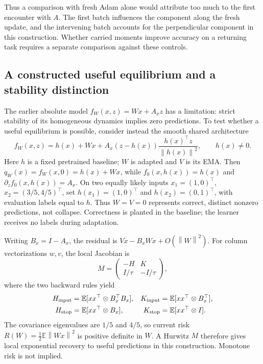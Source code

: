 \documentclass[11pt,a4paper]{article}
\newcommand{\E}{\mathbb{E}}
\newcommand{\norm}[1]{\left\lVert #1\right\rVert}
\begin{document}
Thus a comparison with fresh Adam alone would attribute too much to the
first encounter with $A$. The first batch influences the component along
the fresh update, and the intervening batch accounts for the perpendicular
component in this construction. Whether carried moments improve accuracy
on a returning task requires a separate comparison against these controls.

\subsection{A constructed useful equilibrium and a stability distinction}
The earlier absolute model $f_W(x,z)=Wx+A_xz$ has a limitation: strict
stability of its homogeneous dynamics implies zero predictions. To test
whether a useful equilibrium is possible, consider instead the smooth
shared architecture
\begin{equation}
 f_W(x,z)=h(x)+Wx+
 A_x(z-h(x))\frac{h(x)^\top z}{\norm{h(x)}^2},
 \qquad h(x)\ne0.
 \label{eq:realization}
\end{equation}
Here $h$ is a fixed pretrained baseline; $W$ is adapted and $V$ is its EMA.
Then $q_W(x)=f_W(x,0)=h(x)+Wx$, while $f_0(x,h(x))=h(x)$ and
$\partial_z f_0(x,h(x))=A_x$. On two equally likely inputs
$x_1=(1,0)^\top$, $x_2=(3/5,4/5)^\top$, set
$h(x_1)=(1,0)^\top$ and $h(x_2)=(0,1)^\top$, with evaluation labels
equal to $h$. Thus $W=V=0$ represents correct, distinct nonzero
predictions, not collapse. Correctness is planted in the baseline;
the learner receives no labels during adaptation.

Writing $B_x=I-A_x$, the residual is
$Vx-B_xWx+O(\norm{W}^2)$. For column vectorizations $w,v$, the local
Jacobian is
\begin{equation}
 M=\begin{pmatrix}-H&K\\I/\tau&-I/\tau\end{pmatrix},
 \label{eq:block}
\end{equation}
where the two backward rules yield
\begin{align}
 H_{\rm input}&=\E[xx^\top\otimes B_x^\top B_x],&
 K_{\rm input}&=\E[xx^\top\otimes B_x^\top],\nonumber\\
 H_{\rm stop}&=\E[xx^\top\otimes B_x],&
 K_{\rm stop}&=\E[xx^\top\otimes I].
 \label{eq:blocks}
\end{align}
The covariance eigenvalues are $1/5$ and $4/5$, so current risk
$R(W)=\tfrac12\E\norm{Wx}^2$ is positive definite in $W$.
A Hurwitz $M$ therefore gives local exponential recovery to useful
predictions in this construction. Monotone risk is not implied.
\end{document}
